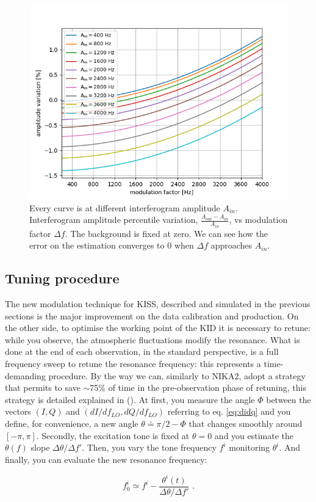 \documentclass[twocolumn,traditabstract]{aa}\\
\begin{document}
\begin{figure}[htf]
	\centering
	\includegraphics[width=.5\textwidth]{3.acqui/several_modulations.png}
	\caption{Every curve is at different interferogram amplitude $A_{in}$. Interferogram amplitude percentile variation, $\frac{A_{out}-A_{in}}{A_{in}}$, vs modulation factor $\Delta f$.  The background is fixed at zero. We can see how the error on the estimation converges to 0 when $\Delta f$ approaches $A_{in}$. }
	\label{fig:amp_mod}
\end{figure}

\subsection{Tuning procedure}
\label{sec:tuning}

The new modulation technique for KISS, described and simulated in the previous sections is the major improvement on the data calibration and production. On the other side, to optimise the working point of the KID it is necessary to retune: while you observe, the atmospheric fluctuations modify the resonance. What is done at the end of each observation, in the standard perspective, is a full frequency sweep to retune the resonance frequency: this represents a time-demanding procedure. By the way we can, similarly to NIKA2, adopt a strategy that permits to save $\sim$75\% of time in the pre-observation phase of retuning, this strategy is detailed explained in (\cite{2014SPIE.9153E..02C}). At first, you measure the angle $\Phi$ between the vectors $(I,Q)$ and $(dI/df_{LO},dQ/df_{LO})$ referring to eq. \ref{eq:didq} and you define, for convenience, a new angle $\theta\doteq \pi/2-\Phi$ that changes smoothly around $[-\pi,\pi]$. Secondly, the excitation tone is fixed at $\theta=0$ and you estimate the $\theta(f)$ slope $\Delta\theta/\Delta f'$. Then, you vary the tone frequency $f^i$ monitoring $\theta^i$. And finally, you can evaluate the new resonance frequency:

\begin{equation}
f^i_0 \simeq f^i - \frac{\theta^i(t)}{\Delta\theta/\Delta f'} \text{ .}
\end{equation}
\end{document}
